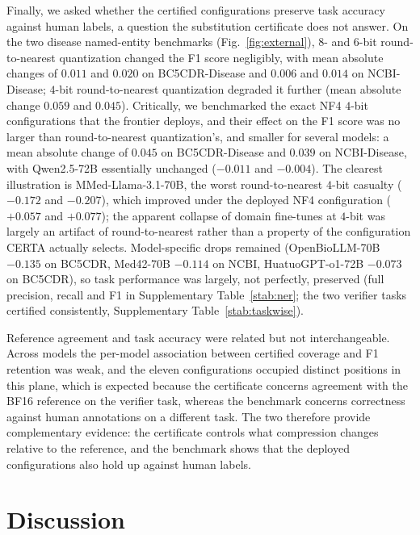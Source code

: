 \documentclass[pdflatex,sn-mathphys-num]{sn-jnl}%
\theoremstyle{thmstyleone}%
\theoremstyle{thmstyletwo}%
\theoremstyle{thmstylethree}%
\begin{document}
Finally, we asked whether the certified configurations preserve task accuracy against human labels,
a question the substitution certificate does not answer. On the two disease named-entity benchmarks (Fig.~\ref{fig:external}),
$8$- and $6$-bit round-to-nearest quantization changed the F1 score negligibly, with mean absolute changes of $0.011$ and
$0.020$ on BC5CDR-Disease and $0.006$ and $0.014$ on NCBI-Disease; $4$-bit round-to-nearest quantization degraded
it further (mean absolute change $0.059$ and $0.045$). Critically, we benchmarked the exact NF4
$4$-bit configurations that the frontier deploys, and their effect on the F1 score was no larger than
round-to-nearest quantization's, and smaller for several models: a mean absolute change of $0.045$ on BC5CDR-Disease and $0.039$ on NCBI-Disease, with Qwen2.5-72B
essentially unchanged ($-0.011$ and $-0.004$). The clearest illustration is MMed-Llama-3.1-70B, the
worst round-to-nearest $4$-bit casualty ($-0.172$ and $-0.207$), which improved under the deployed
NF4 configuration ($+0.057$ and $+0.077$); the apparent collapse of domain fine-tunes at $4$-bit was
largely an artifact of round-to-nearest rather than a property of the configuration CERTA actually
selects. Model-specific drops remained (OpenBioLLM-70B $-0.135$ on BC5CDR, Med42-70B $-0.114$ on
NCBI, HuatuoGPT-o1-72B $-0.073$ on BC5CDR), so task performance was largely, not perfectly,
preserved (full precision, recall and F1 in Supplementary Table~\ref{stab:ner}; the two verifier
tasks certified consistently, Supplementary Table~\ref{stab:taskwise}).
 
Reference agreement and task accuracy were related but not interchangeable. Across models the
per-model association between certified coverage and F1 retention was weak, and the eleven
configurations occupied distinct positions in this plane,
which is expected because the certificate concerns agreement with the BF16 reference on the
verifier task, whereas the benchmark concerns correctness against human annotations on a different
task. The two therefore provide complementary evidence: the certificate controls what compression
changes relative to the reference, and the benchmark shows that the deployed configurations also
hold up against human labels.




\section*{Discussion}
 
\end{document}
